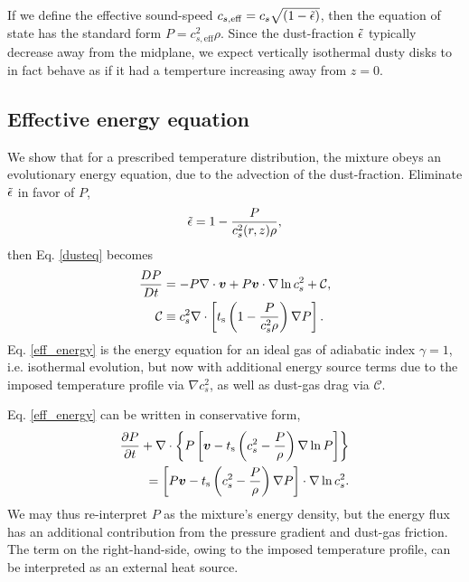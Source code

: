 If we define the effective sound-speed $c_{s,\mathrm{eff}} = c_s\sqrt{\left(1 -
    \tilde{\epsilon}\right)}$, then the equation of state has the standard
form $P=c_{s,\mathrm{eff}}^2\rho$. Since the dust-fraction $\tilde{\epsilon}$
typically decrease away from the midplane, we expect vertically
isothermal dusty disks to in fact behave as if it
had a temperture increasing away from $z=0$.   

\subsection{Effective energy equation}
We show that for a prescribed temperature distribution, the mixture
obeys an evolutionary energy equation, due to the advection of the
dust-fraction. Eliminate $\tilde{\epsilon}$ in favor of $P$, 
\begin{align*}
  \tilde{\epsilon} = 1 - \frac{P}{c_s^2(r,z)\rho}, 
\end{align*}
then Eq. \ref{dusteq} becomes
\begin{align}
\frac{DP}{Dt} &= - P \nabla\cdot\bm{v} + P\bm{v}\cdot\nabla\ln{c_s^2}
                + \mathcal{C},  \label{eff_energy} \\
\mathcal{C}&\equiv c_s^2 \nabla\cdot\left[t_\mathrm{s}\left(1 -
  \frac{P}{c_s^2\rho}\right)\nabla 
  P\right].
\end{align}
Eq. \ref{eff_energy} is the energy equation for an ideal gas of adiabatic index
$\gamma=1$, i.e. isothermal evolution, but now with additional energy source 
terms due to the imposed temperature profile via $\nabla c_s^2$, as
well as dust-gas drag via $\mathcal{C}$. 

Eq. \ref{eff_energy} can be written in conservative form,
\begin{align*}
  \frac{\partial P}{ \partial t} + \nabla\cdot\left\{P\left[\bm{v} -
      t_\mathrm{s}\left(c_s^2 - \frac{P}{\rho}\right)\nabla\ln{P}\right]
    \right\}\\
  = \left[P\bm{v} - t_\mathrm{s}\left(c_s^2 - \frac{P}{\rho}\right)\nabla
    P\right]\cdot\nabla\ln{c_s^2}. 
\end{align*}
We may thus re-interpret $P$ as the mixture's energy density, but the
energy flux has an additional contribution from the pressure
gradient and dust-gas friction. The term on the right-hand-side, owing
to the imposed temperature profile, can be interpreted as an external
heat source.  



